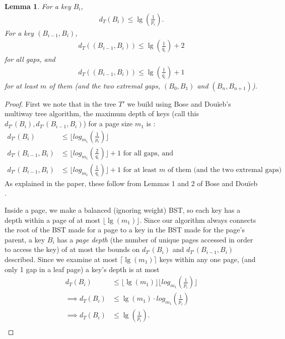 \documentclass[letterpaper,12pt,titlepage,oneside,final]{book}
\theoremstyle{plain}
\newtheorem{lem}[thm]{Lemma}
\begin{document}
\begin{lem} \label{451}
For a key $B_i$,
\begin{align*} 
d_T(B_i) \leq \lg(\frac{1}{p_i}).
\end{align*}
For a key $(B_{i-1},B_i)$,
\begin{align*} 
d_T((B_{i-1},B_i)) \leq \lg(\frac{1}{q_i}) + 2
\end{align*}
for all gaps, and
\begin{align*} 
d_T((B_{i-1},B_i)) \leq \lg(\frac{1}{q_i}) + 1
\end{align*}
for at least $m$ of them (and the two extremal gaps, $(B_0, B_1)$ and $(B_n, B_{n+1})$). 
  
\end{lem}

\begin{proof}
First we note that in the tree $T'$ we build using Bose and Dou\"{i}eb's multiway tree algorithm, the maximum depth of keys (call this $d_{T'}(B_i), d_{T'}(B_{i-1},B_i)$) for a page size $m_1$ is \cite{bose2009efficient}:
\begin{align*} d_{T'}(B_i) &\leq \lfloor log_{m_1}(\frac{1}{p_i}) \rfloor \\
d_{T'}(B_{i-1},B_i) &\leq \lfloor log_{m_1}(\frac{2}{q_i}) \rfloor + 1 \text{ for all gaps, and}\\
d_{T'}(B_{i-1},B_i) &\leq \lfloor log_{m_1}(\frac{1}{q_i}) \rfloor + 1 \text{ for at least $m$ of them (and the two extremal gaps)}
 \end{align*}
As explained in the paper, these follow from Lemmas 1 and 2 of Bose and Dou\"{i}eb \cite{bose2009efficient}.

Inside a page, we make a balanced (ignoring weight) BST, so each key has a depth within a page of at most $\lfloor \lg(m_1) \rfloor$. Since our algorithm always connects the root of the BST made for a page to a key in the BST made for the page's parent, a key $B_i$ has a \textit{page depth} (the number of unique pages accessed in order to access the key) of at most the bounds on $d_{T'}(B_i)$ and $d_{T'}(B_{i-1},B_i)$ described. Since we examine at most $\lceil \lg(m_1) \rceil$ keys within any one page, (and only 1 gap in a leaf page) a key's depth is at most
\begin{align*}
d_T(B_i) &\leq \lfloor \lg(m_1) \rfloor \lfloor log_{m_1}(\frac{1}{p_i}) \rfloor \\
\implies d_T(B_i) &\leq \lg(m_1)\cdot log_{m_1}(\frac{1}{p_i}) \\
\implies d_T(B_i) &\leq \lg(\frac{1}{p_i}). \\
\end{align*}


\end{proof}
\end{document}
